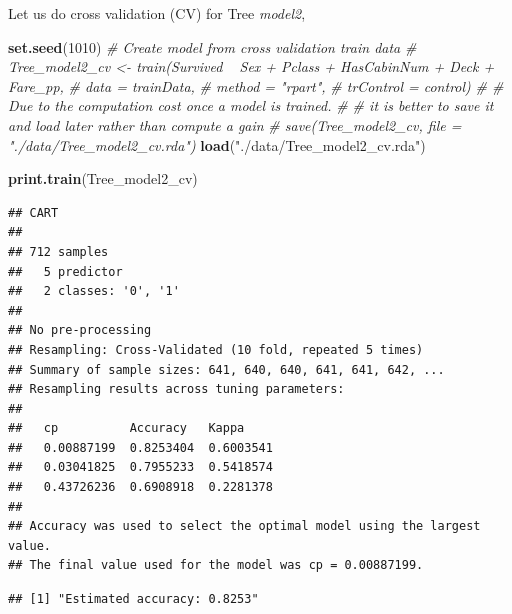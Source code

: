 \documentclass[
]{book}
\newenvironment{Shaded}{\begin{snugshade}}{\end{snugshade}}
\newcommand{\CommentTok}[1]{\textcolor[rgb]{0.56,0.35,0.01}{\textit{#1}}}
\newcommand{\DataTypeTok}[1]{\textcolor[rgb]{0.13,0.29,0.53}{#1}}
\newcommand{\DecValTok}[1]{\textcolor[rgb]{0.00,0.00,0.81}{#1}}
\newcommand{\KeywordTok}[1]{\textcolor[rgb]{0.13,0.29,0.53}{\textbf{#1}}}
\newcommand{\NormalTok}[1]{#1}
\newcommand{\OperatorTok}[1]{\textcolor[rgb]{0.81,0.36,0.00}{\textbf{#1}}}
\newcommand{\StringTok}[1]{\textcolor[rgb]{0.31,0.60,0.02}{#1}}
\begin{document}
Let us do cross validation (CV) for Tree \emph{model2},

\begin{Shaded}
\begin{Highlighting}[]
\KeywordTok{set.seed}\NormalTok{(}\DecValTok{1010}\NormalTok{)}
\CommentTok{# Create model from cross validation train data}
\CommentTok{#  Tree_model2_cv <- train(Survived ~ Sex + Pclass + HasCabinNum + Deck + Fare_pp,}
\CommentTok{#                       data = trainData,}
\CommentTok{#                       method = "rpart",}
\CommentTok{#                       trControl = control)}
\CommentTok{# # Due to the computation cost once a model is trained. }
\CommentTok{# # it is better to save it and load later rather than compute a gain}
\CommentTok{# save(Tree_model2_cv, file = "./data/Tree_model2_cv.rda")}
\KeywordTok{load}\NormalTok{(}\StringTok{"./data/Tree_model2_cv.rda"}\NormalTok{)}

\KeywordTok{print.train}\NormalTok{(Tree_model2_cv)}
\end{Highlighting}
\end{Shaded}

\begin{verbatim}
## CART 
## 
## 712 samples
##   5 predictor
##   2 classes: '0', '1' 
## 
## No pre-processing
## Resampling: Cross-Validated (10 fold, repeated 5 times) 
## Summary of sample sizes: 641, 640, 640, 641, 641, 642, ... 
## Resampling results across tuning parameters:
## 
##   cp          Accuracy   Kappa    
##   0.00887199  0.8253404  0.6003541
##   0.03041825  0.7955233  0.5418574
##   0.43726236  0.6908918  0.2281378
## 
## Accuracy was used to select the optimal model using the largest value.
## The final value used for the model was cp = 0.00887199.
\end{verbatim}

\begin{Shaded}
\end{Shaded}

\begin{verbatim}
## [1] "Estimated accuracy: 0.8253"
\end{verbatim}
\end{document}
